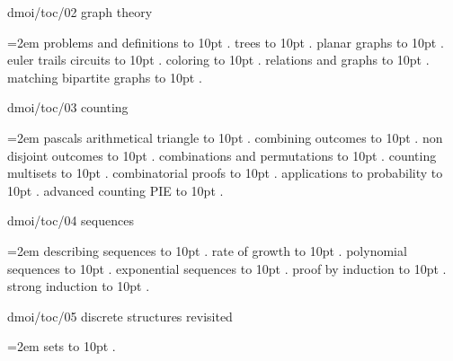 \bigskip
{}
dmoi/toc/02 graph theory
\par\begingroup
\leftskip=2em
\smallskip
{} problems and definitions \leaders\hbox to 10pt {\hss.\hss}  \hfill {}
 trees \leaders\hbox to 10pt {\hss.\hss}  \hfill {}
 planar graphs \leaders\hbox to 10pt {\hss.\hss}  \hfill {}
 euler trails circuits \leaders\hbox to 10pt {\hss.\hss}  \hfill {}
 coloring \leaders\hbox to 10pt {\hss.\hss}  \hfill {}
 relations and graphs \leaders\hbox to 10pt {\hss.\hss}  \hfill {}
 matching bipartite graphs \leaders\hbox to 10pt {\hss.\hss}  \hfill {}
\smallskip
\par\endgroup
\bigskip
{}
dmoi/toc/03 counting
\par\begingroup
\leftskip=2em
\smallskip
{} pascals arithmetical triangle \leaders\hbox to 10pt {\hss.\hss}  \hfill {}
 combining outcomes \leaders\hbox to 10pt {\hss.\hss}  \hfill {}
 non disjoint outcomes \leaders\hbox to 10pt {\hss.\hss}  \hfill {}
 combinations and permutations \leaders\hbox to 10pt {\hss.\hss}  \hfill {}
 counting multisets \leaders\hbox to 10pt {\hss.\hss}  \hfill {}
 combinatorial proofs \leaders\hbox to 10pt {\hss.\hss}  \hfill {}
 applications to probability \leaders\hbox to 10pt {\hss.\hss}  \hfill {}
 advanced counting PIE \leaders\hbox to 10pt {\hss.\hss}  \hfill {}
\smallskip
\par\endgroup
\bigskip
{}
dmoi/toc/04 sequences
\par\begingroup
\leftskip=2em
\smallskip
{} describing sequences \leaders\hbox to 10pt {\hss.\hss}  \hfill {}
 rate of growth \leaders\hbox to 10pt {\hss.\hss}  \hfill {}
 polynomial sequences \leaders\hbox to 10pt {\hss.\hss}  \hfill {}
 exponential sequences \leaders\hbox to 10pt {\hss.\hss}  \hfill {}
 proof by induction \leaders\hbox to 10pt {\hss.\hss}  \hfill {}
 strong induction \leaders\hbox to 10pt {\hss.\hss}  \hfill {}
\smallskip
\par\endgroup
\bigskip
{}
dmoi/toc/05 discrete structures revisited
\par\begingroup
\leftskip=2em
\smallskip
{} sets \leaders\hbox to 10pt {\hss.\hss}  \hfill {}

